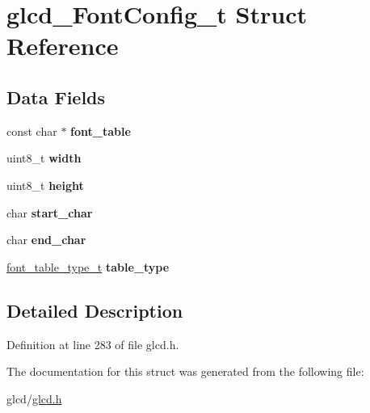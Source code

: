 \hypertarget{structglcd___font_config__t}{}\section{glcd\+\_\+\+Font\+Config\+\_\+t Struct Reference}
\label{structglcd___font_config__t}
\subsection*{Data Fields}
\begin{DoxyCompactItemize}
\item 
\hypertarget{structglcd___font_config__t_addd293413f6c5fa7615b9d8f5c7f8f66}{}const char $\ast$ {\bfseries font\+\_\+table}\label{structglcd___font_config__t_addd293413f6c5fa7615b9d8f5c7f8f66}

\item 
\hypertarget{structglcd___font_config__t_a09a2a45f731b02946ff6d3cd15c1a476}{}uint8\+\_\+t {\bfseries width}\label{structglcd___font_config__t_a09a2a45f731b02946ff6d3cd15c1a476}

\item 
\hypertarget{structglcd___font_config__t_adcf201a8aabf55cb352ec05331242594}{}uint8\+\_\+t {\bfseries height}\label{structglcd___font_config__t_adcf201a8aabf55cb352ec05331242594}

\item 
\hypertarget{structglcd___font_config__t_a03535d979603bfbbf85a5fe5c4e1a176}{}char {\bfseries start\+\_\+char}\label{structglcd___font_config__t_a03535d979603bfbbf85a5fe5c4e1a176}

\item 
\hypertarget{structglcd___font_config__t_a98232dc5af0ccab4ba04e8abe43453d6}{}char {\bfseries end\+\_\+char}\label{structglcd___font_config__t_a98232dc5af0ccab4ba04e8abe43453d6}

\item 
\hypertarget{structglcd___font_config__t_a3fe6197b588f19e18cb1350ca351196b}{}\hyperlink{glcd_8h_aa7d560e99250d8d8f19117bd74e4924b}{font\+\_\+table\+\_\+type\+\_\+t} {\bfseries table\+\_\+type}\label{structglcd___font_config__t_a3fe6197b588f19e18cb1350ca351196b}

\end{DoxyCompactItemize}


\subsection{Detailed Description}


Definition at line 283 of file glcd.\+h.



The documentation for this struct was generated from the following file\+:\begin{DoxyCompactItemize}
\item 
glcd/\hyperlink{glcd_8h}{glcd.\+h}\end{DoxyCompactItemize}
